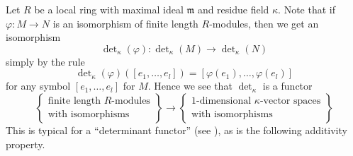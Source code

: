 \noindent
Let $R$ be a local ring with maximal ideal $\mathfrak m$ and
residue field $\kappa$. Note that if $\varphi : M \to N$ is an
isomorphism of finite length $R$-modules, then we get an
isomorphism
$$
\det\nolimits_\kappa(\varphi) :
\det\nolimits_\kappa(M)
\to
\det\nolimits_\kappa(N)
$$
simply by the rule
$$
\det\nolimits_\kappa(\varphi)([e_1, \ldots, e_l])
=
[\varphi(e_1), \ldots, \varphi(e_l)]
$$
for any symbol $[e_1, \ldots, e_l]$ for $M$.
Hence we see that $\det\nolimits_\kappa$ is a functor
\begin{equation}
\left\{
\begin{matrix}
\text{finite length $R$-modules}\\
\text{with isomorphisms}
\end{matrix}
\right\}
\longrightarrow
\left\{
\begin{matrix}
1\text{-dimensional }\kappa\text{-vector spaces}\\
\text{with isomorphisms}
\end{matrix}
\right\}
\end{equation}
This is typical for a ``determinant functor''
(see \cite{Knudsen}), as is the following additivity
property.

